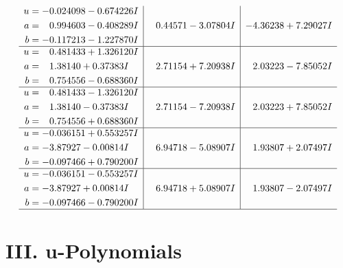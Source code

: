 \documentclass[1p]{elsarticle_modified}
\theoremstyle{definition}
\begin{document}
$$\begin{array}{c|c|c}
\begin{aligned}
u &= -0.024098 - 0.674226 I \\
a &= \phantom{-}0.994603 - 0.408289 I \\
b &= -0.117213 - 1.227870 I\end{aligned}
 & \phantom{-}0.44571 - 3.07804 I & -4.36238 + 7.29027 I \\ \hline\begin{aligned}
u &= \phantom{-}0.481433 + 1.326120 I \\
a &= \phantom{-}1.38140 + 0.37383 I \\
b &= \phantom{-}0.754556 - 0.688360 I\end{aligned}
 & \phantom{-}2.71154 + 7.20938 I & \phantom{-}2.03223 - 7.85052 I \\ \hline\begin{aligned}
u &= \phantom{-}0.481433 - 1.326120 I \\
a &= \phantom{-}1.38140 - 0.37383 I \\
b &= \phantom{-}0.754556 + 0.688360 I\end{aligned}
 & \phantom{-}2.71154 - 7.20938 I & \phantom{-}2.03223 + 7.85052 I \\ \hline\begin{aligned}
u &= -0.036151 + 0.553257 I \\
a &= -3.87927 - 0.00814 I \\
b &= -0.097466 + 0.790200 I\end{aligned}
 & \phantom{-}6.94718 - 5.08907 I & \phantom{-}1.93807 + 2.07497 I \\ \hline\begin{aligned}
u &= -0.036151 - 0.553257 I \\
a &= -3.87927 + 0.00814 I \\
b &= -0.097466 - 0.790200 I\end{aligned}
 & \phantom{-}6.94718 + 5.08907 I & \phantom{-}1.93807 - 2.07497 I\\
 \hline 
 \end{array}$$\newpage
\newpage\renewcommand{\arraystretch}{1}
\centering \section*{ III. u-Polynomials}
\end{document}
